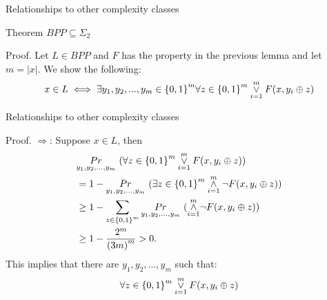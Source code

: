         \begin{frame}{Relationships to other complexity classes}
            \begin{block}{Theorem}
                $BPP \subseteq \Sigma_2$
            \end{block}
            \pause
            \begin{block}{Proof.}
                Let $L \in BPP$ and $F$ has the property in the previous
                lemma and let $ m = |x|$. We show the following:
                $$x\in L \iff \exists y_1,y_2,...,y_{m} \in {\{0,1\}}^{m}
                \forall z \in {\{0,1\}}^{m} \orr{i=1}{m} F(x,y_i\oplus z)$$
            \end{block}
        \end{frame}

        \begin{frame}{Relationships to other complexity classes}
            \begin{block}{Proof.}
                $\Rightarrow$: Suppose $x \in L$, then 
                \begin{align*}
                    & \underset{y_1,y_2,...,y_m}{Pr}\ 
                    (\forall z \in {\{0,1\}}^m 
                     \orr{i=1}{m} F(x,y_i\oplus z))\\
                    & = 1- \underset{y_1,y_2,...,y_m}{Pr}\ 
                    ( \exists z \in {\{0,1\}}^m
                     \andd{i=1}{m} \neg F(x,y_i\oplus z))\\
                    & \geq 1- \sum\limits_{z\in{\{0,1\}}^{m}} 
                    \underset{y_1,y_2,...,y_m}{Pr}\ 
                    (\andd{i=1}{m} \neg F(x,y_i\oplus z))\\
                    & \geq 1-  \frac{2^{m}}{{(3m)}^{m}} > 0.
                \end{align*}
            This implies that there are $y_1,y_2,...,y_m$ such that:
            $$\forall z \in {\{0,1\}}^{m} \orr{i=1}{m} F(x,y_i\oplus z)$$
            \end{block}
        \end{frame}

